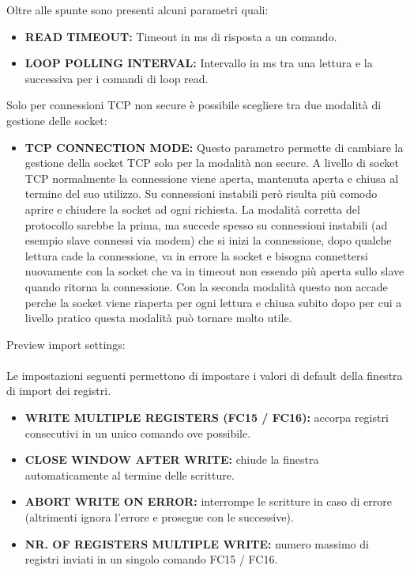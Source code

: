 Oltre alle spunte sono presenti alcuni parametri quali:

\begin{itemize}
    \item \textbf{READ TIMEOUT:}
    Timeout in ms di risposta a un comando.
    \item \textbf{LOOP POLLING INTERVAL:}
    Intervallo in ms tra una lettura e la successiva per i comandi di loop read.
\end{itemize}

Solo per connessioni TCP non secure è possibile scegliere tra due modalità
di gestione delle socket:

\begin{itemize}
    \item \textbf{TCP CONNECTION MODE:}
    Questo parametro permette di cambiare la gestione della socket TCP solo per la 
    modalità non secure. A livello di socket TCP normalmente la connessione viene aperta,
    mantenuta aperta e chiusa al termine del suo utilizzo.
    Su connessioni instabili però risulta più comodo aprire e 
    chiudere la socket ad ogni richiesta.
    La modalità corretta del protocollo sarebbe la prima,
    ma succede spesso 
    su connessioni instabili (ad esempio slave connessi via modem) che si inizi la connessione,
    dopo qualche lettura cade la connessione, va in errore la socket e bisogna connettersi nuovamente
    con la socket che va in timeout non essendo più aperta sullo slave 
    quando ritorna la connessione. Con la seconda
    modalità questo non accade perche la socket viene riaperta per ogni lettura 
    e chiusa subito dopo per cui a livello pratico questa modalità può tornare molto utile.
\end{itemize}

Preview import settings:
\\\\
Le impostazioni seguenti permettono di impostare i valori di default
della finestra di import dei registri.

\begin{itemize}
    \item \textbf{WRITE MULTIPLE REGISTERS (FC15 / FC16):} accorpa registri consecutivi in un unico comando ove possibile.
    \item \textbf{CLOSE WINDOW AFTER WRITE:} chiude la finestra automaticamente al termine delle scritture.
    \item \textbf{ABORT WRITE ON ERROR:} interrompe le scritture in caso di errore (altrimenti ignora l'errore e prosegue con le successive).
    \item \textbf{NR. OF REGISTERS MULTIPLE WRITE:} numero massimo di registri inviati in un singolo comando FC15 / FC16.
\end{itemize}